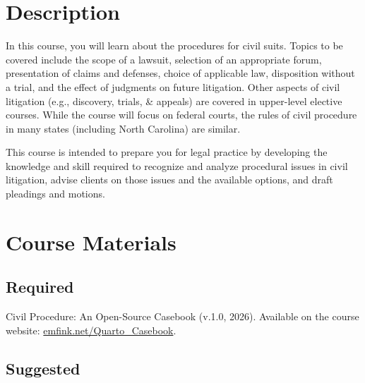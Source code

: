 \documentclass[11pt,letterpaper,twoside]{article}
\begin{document}

\chapter*{Description}\label{description}


In this course, you will learn about the procedures for civil suits.
Topics to be covered include the scope of a lawsuit, selection of an
appropriate forum, presentation of claims and defenses, choice of
applicable law, disposition without a trial, and the effect of judgments
on future litigation. Other aspects of civil litigation (e.g.,
discovery, trials, \& appeals) are covered in upper-level elective
courses. While the course will focus on federal courts, the rules of
civil procedure in many states (including North Carolina) are similar.

This course is intended to prepare you for legal practice by developing
the knowledge and skill required to recognize and analyze procedural
issues in civil litigation, advise clients on those issues and the
available options, and draft pleadings and motions.


\chapter*{Course Materials}\label{course-materials}


\section*{Required}\label{required}


Civil Procedure: An Open-Source Casebook (v.1.0, 2026). Available on the
course website:
{\href{https://www.emfink.net/Quarto_Casebook/}{emfink.net/Quarto\_Casebook}}.

\section*{Suggested}\label{suggested}
\end{document}
